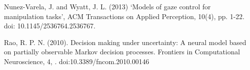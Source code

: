 \documentclass[11]{article}
\begin{document}
%
%
%
%
%
%
%
%

\pagebreak

\begin{thebibliography}{9}
Nunez-Varela, J. and Wyatt, J. L. (2013) ‘Models of gaze control for manipulation tasks’, ACM Transactions on Applied Perception, 10(4), pp. 1-22. doi: 10.1145/2536764.2536767.

Rao, R. P. N. (2010). Decision making under uncertainty: A neural model based on partially observable Markov decision processes. Frontiers in Computational Neuroscience, 4, . doi:10.3389/fncom.2010.00146

\end{thebibliography}
\end{document}
